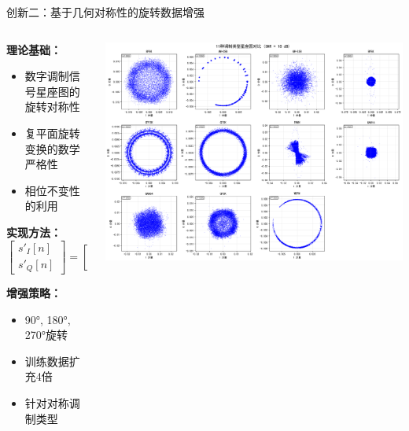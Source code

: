 \documentclass[aspectratio=169]{beamer}
\begin{document}
\begin{frame}{创新二：基于几何对称性的旋转数据增强}
\begin{columns}
\begin{column}{0.5\textwidth}
\textbf{理论基础：}
\begin{itemize}
\item 数字调制信号星座图的旋转对称性
\item 复平面旋转变换的数学严格性
\item 相位不变性的利用
\end{itemize}

\textbf{实现方法：}
\begin{equation}
\begin{bmatrix} s'_I[n] \\ s'_Q[n] \end{bmatrix} = \begin{bmatrix} \cos\theta & -\sin\theta \\ \sin\theta & \cos\theta \end{bmatrix} \begin{bmatrix} s_I[n] \\ s_Q[n] \end{bmatrix}
\end{equation}

\textbf{增强策略：}
\begin{itemize}
\item 90°, 180°, 270°旋转
\item 训练数据扩充4倍
\item 针对对称调制类型
\end{itemize}
\end{column}
\begin{column}{0.5\textwidth}
\includegraphics[width=\textwidth]{../paper/figure/constellation.png}
\end{column}
\end{columns}
\end{frame}
\end{document}
